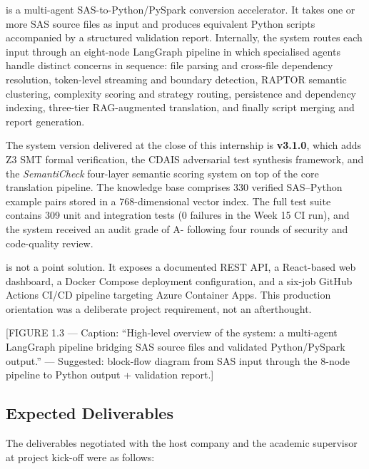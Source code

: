\codara{} is a multi-agent \ac{SAS}-to-Python/PySpark conversion accelerator.
It takes one or more SAS source files as input and produces equivalent Python
scripts accompanied by a structured validation report. Internally, the system
routes each input through an eight-node \ac{LangGraph} pipeline in which
specialised agents handle distinct concerns in sequence: file parsing and
cross-file dependency resolution, token-level streaming and boundary detection,
\ac{RAPTOR} semantic clustering, complexity scoring and strategy routing,
persistence and dependency indexing, three-tier \ac{RAG}-augmented translation,
and finally script merging and report generation.

The system version delivered at the close of this internship is \textbf{v3.1.0},
which adds Z3 \ac{SMT} formal verification, the \ac{CDAIS} adversarial test
synthesis framework, and the \textit{SemantiCheck} four-layer semantic scoring
system on top of the core translation pipeline. The knowledge base comprises
330 verified SAS–Python example pairs stored in a 768-dimensional vector index.
The full test suite contains 309 unit and integration tests (0 failures in the
Week 15 CI run), and the system received an audit grade of A- following four
rounds of security and code-quality review.

\codara{} is not a point solution. It exposes a documented REST API, a
React-based web dashboard, a Docker Compose deployment configuration, and a
six-job GitHub Actions \ac{CI/CD} pipeline targeting Azure Container Apps.
This production orientation was a deliberate project requirement, not an
afterthought.

[FIGURE 1.3 --- Caption: ``High-level overview of the \codara{} system: a
multi-agent LangGraph pipeline bridging SAS source files and validated
Python/PySpark output.'' --- Suggested: block-flow diagram from SAS input
through the 8-node pipeline to Python output + validation report.]

\subsection{Expected Deliverables}
\label{subsec:deliverables}

The deliverables negotiated with the host company and the academic supervisor
at project kick-off were as follows:

